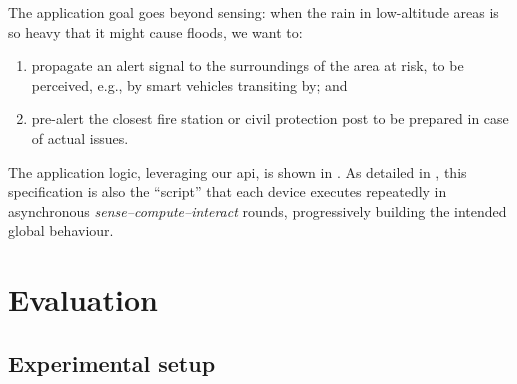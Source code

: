The application goal goes beyond sensing: 
when the rain in low-altitude areas is so heavy that it might cause floods,
we want to:
\begin{enumerate}
  \item propagate an alert signal to the surroundings of the area at risk, to be perceived, e.g., by smart vehicles transiting by; and
  \item pre-alert the closest fire station or civil protection post to be prepared in case of actual issues.
\end{enumerate}
%
The application logic, leveraging our \ac{api}, is %
 shown in .
%
%
As detailed in \cite{DBLP:conf/isola/CasadeiVAD20,DBLP:journals/eaai/CasadeiVAPD21},
this specification is also the ``script'' that each device executes repeatedly in asynchronous \emph{sense--compute--interact} rounds,  %
progressively building the intended global behaviour.

\section{Evaluation}\label{sec:eval}


\subsection{Experimental setup}\label{s:experiment:setup}

